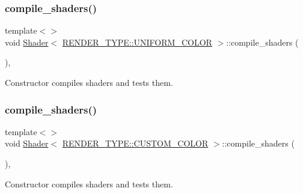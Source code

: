 \subsubsection{\texorpdfstring{compile\+\_\+shaders()}{compile\_shaders()}\hspace{0.1cm}{\footnotesize\ttfamily [4/6]}}
{\footnotesize\ttfamily template$<$$>$ \\
void \mbox{\hyperlink{classShader}{Shader}}$<$ \mbox{\hyperlink{shader__class_8hpp_a24e288e18eb7b6e01de7565001fedb60aa98862073f71a928bad5099cc3e1c2ed}{R\+E\+N\+D\+E\+R\+\_\+\+T\+Y\+P\+E\+::\+U\+N\+I\+F\+O\+R\+M\+\_\+\+C\+O\+L\+OR}} $>$\+::compile\+\_\+shaders (\begin{DoxyParamCaption}{ }\end{DoxyParamCaption})\hspace{0.3cm}{\ttfamily [inline]}, {\ttfamily [protected]}}



Constructor compiles shaders and tests them. 

\mbox{\label{classShader_ae486635d367b6054482c56747ed74846}} 
\subsubsection{\texorpdfstring{compile\+\_\+shaders()}{compile\_shaders()}\hspace{0.1cm}{\footnotesize\ttfamily [5/6]}}
{\footnotesize\ttfamily template$<$$>$ \\
void \mbox{\hyperlink{classShader}{Shader}}$<$ \mbox{\hyperlink{shader__class_8hpp_a24e288e18eb7b6e01de7565001fedb60a9d34355b5a26c54b5dbab1e45245a6f4}{R\+E\+N\+D\+E\+R\+\_\+\+T\+Y\+P\+E\+::\+C\+U\+S\+T\+O\+M\+\_\+\+C\+O\+L\+OR}} $>$\+::compile\+\_\+shaders (\begin{DoxyParamCaption}{ }\end{DoxyParamCaption})\hspace{0.3cm}{\ttfamily [inline]}, {\ttfamily [protected]}}



Constructor compiles shaders and tests them. 

\mbox{\label{classShader_ae486635d367b6054482c56747ed74846}} 
